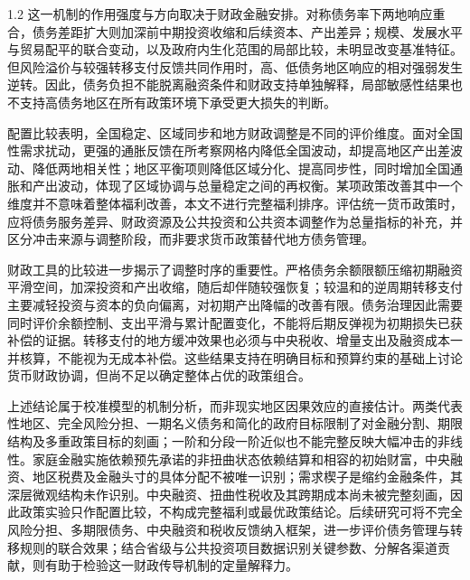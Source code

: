 \documentclass[12pt,UTF8]{ctexart}
\begin{document}
\begin{spacing}{1.2}
		这一机制的作用强度与方向取决于财政金融安排。对称债务率下两地响应重合，债务差距扩大则加深前中期投资收缩和后续资本、产出差异；规模、发展水平与贸易配平的联合变动，以及政府内生化范围的局部比较，未明显改变基准特征。但风险溢价与较强转移支付反馈共同作用时，高、低债务地区响应的相对强弱发生逆转。因此，债务负担不能脱离融资条件和财政支持单独解释，局部敏感性结果也不支持高债务地区在所有政策环境下承受更大损失的判断。
		
		配置比较表明，全国稳定、区域同步和地方财政调整是不同的评价维度。面对全国性需求扰动，更强的通胀反馈在所考察网格内降低全国波动，却提高地区产出差波动、降低两地相关性；地区平衡项则降低区域分化、提高同步性，同时增加全国通胀和产出波动，体现了区域协调与总量稳定之间的再权衡。某项政策改善其中一个维度并不意味着整体福利改善，本文不进行完整福利排序。评估统一货币政策时，应将债务服务差异、财政资源及公共投资和公共资本调整作为总量指标的补充，并区分冲击来源与调整阶段，而非要求货币政策替代地方债务管理。
		
		财政工具的比较进一步揭示了调整时序的重要性。严格债务余额限额压缩初期融资平滑空间，加深投资和产出收缩，随后却伴随较强恢复；较温和的逆周期转移支付主要减轻投资与资本的负向偏离，对初期产出降幅的改善有限。债务治理因此需要同时评价余额控制、支出平滑与累计配置变化，不能将后期反弹视为初期损失已获补偿的证据。转移支付的地方缓冲效果也必须与中央税收、增量支出及融资成本一并核算，不能视为无成本补偿。这些结果支持在明确目标和预算约束的基础上讨论货币财政协调，但尚不足以确定整体占优的政策组合。
		
		上述结论属于校准模型的机制分析，而非现实地区因果效应的直接估计。两类代表性地区、完全风险分担、一期名义债务和简化的政府目标限制了对金融分割、期限结构及多重政策目标的刻画；一阶和分段一阶近似也不能完整反映大幅冲击的非线性。家庭金融实施依赖预先承诺的非扭曲状态依赖结算和相容的初始财富，中央融资、地区税费及金融头寸的具体分配不被唯一识别；需求楔子是缩约金融条件，其深层微观结构未作识别。中央融资、扭曲性税收及其跨期成本尚未被完整刻画，因此政策实验只作配置比较，不构成完整福利或最优政策结论。后续研究可将不完全风险分担、多期限债务、中央融资和税收反馈纳入框架，进一步评价债务管理与转移规则的联合效果；结合省级与公共投资项目数据识别关键参数、分解各渠道贡献，则有助于检验这一财政传导机制的定量解释力。
		
	\end{spacing}
	
\end{document}
